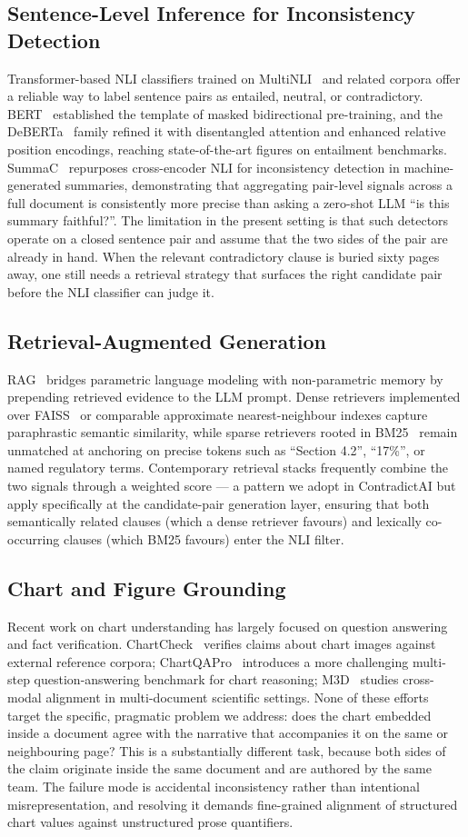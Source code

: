 \documentclass[conference]{IEEEtran}
\begin{document}
\subsection{Sentence-Level Inference for Inconsistency Detection}
Transformer-based NLI classifiers trained on MultiNLI~\cite{b4} and related corpora offer a reliable way to label sentence pairs as entailed, neutral, or contradictory. BERT~\cite{b2} established the template of masked bidirectional pre-training, and the DeBERTa~\cite{b3} family refined it with disentangled attention and enhanced relative position encodings, reaching state-of-the-art figures on entailment benchmarks. SummaC~\cite{b1} repurposes cross-encoder NLI for inconsistency detection in machine-generated summaries, demonstrating that aggregating pair-level signals across a full document is consistently more precise than asking a zero-shot LLM ``is this summary faithful?''. The limitation in the present setting is that such detectors operate on a closed sentence pair and assume that the two sides of the pair are already in hand. When the relevant contradictory clause is buried sixty pages away, one still needs a retrieval strategy that surfaces the right candidate pair before the NLI classifier can judge it.
\subsection{Retrieval-Augmented Generation}
RAG~\cite{b5} bridges parametric language modeling with non-parametric memory by prepending retrieved evidence to the LLM prompt. Dense retrievers implemented over FAISS~\cite{b6} or comparable approximate nearest-neighbour indexes capture paraphrastic semantic similarity, while sparse retrievers rooted in BM25~\cite{b7} remain unmatched at anchoring on precise tokens such as ``Section 4.2'', ``17\%'', or named regulatory terms. Contemporary retrieval stacks frequently combine the two signals through a weighted score --- a pattern we adopt in ContradictAI but apply specifically at the candidate-pair generation layer, ensuring that both semantically related clauses (which a dense retriever favours) and lexically co-occurring clauses (which BM25 favours) enter the NLI filter.
\subsection{Chart and Figure Grounding}
Recent work on chart understanding has largely focused on question answering and fact verification. ChartCheck~\cite{b8} verifies claims about chart images against external reference corpora; ChartQAPro~\cite{b9} introduces a more challenging multi-step question-answering benchmark for chart reasoning; M3D~\cite{b10} studies cross-modal alignment in multi-document scientific settings. None of these efforts target the specific, pragmatic problem we address: does the chart embedded inside a document agree with the narrative that accompanies it on the same or neighbouring page? This is a substantially different task, because both sides of the claim originate inside the same document and are authored by the same team. The failure mode is accidental inconsistency rather than intentional misrepresentation, and resolving it demands fine-grained alignment of structured chart values against unstructured prose quantifiers.
\end{document}
